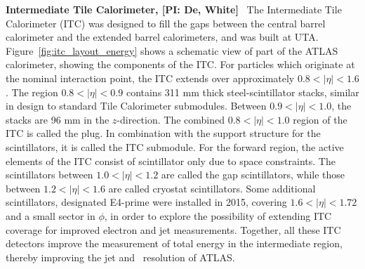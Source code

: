 \textbf{Intermediate Tile Calorimeter, [PI: De, White]} \
The Intermediate Tile Calorimeter (ITC) was designed to fill the
gaps between the central barrel calorimeter and the extended
barrel calorimeters, and was built at UTA. Figure~\ref{fig:itc_layout_energy} shows a schematic
view of part of the ATLAS calorimeter, showing the
components of the ITC. For particles which originate at the
nominal interaction point, the ITC extends over approximately $0.8
< |\eta| < 1.6$. The region $0.8 < |\eta| < 0.9$ contains 311 mm
thick steel-scintillator stacks, similar in design to standard
Tile Calorimeter submodules. Between $0.9 < |\eta| < 1.0$, the
stacks are 96 mm in the $z$-direction. The combined $0.8 < |\eta|
< 1.0$ region of the ITC is called the plug. In combination with
the support structure for the scintillators, it is called the ITC
submodule. For the forward region, the active elements of the ITC
consist of scintillator only due to space constraints. The
scintillators between $1.0 < |\eta| < 1.2$ are called the gap
scintillators, while those between $1.2 < |\eta| < 1.6$ are called
cryostat scintillators. Some additional scintillators, designated
E4-prime were installed in 2015, covering $1.6 < |\eta| < 1.72$ and
a small sector in $\phi$, in order to explore the possibility of extending
ITC coverage for improved electron and jet measurements.
Together, all these ITC detectors improve the measurement of
total energy in the intermediate region, thereby improving the jet
and \met\ resolution of ATLAS.

